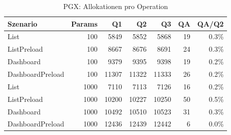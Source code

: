 \begin{table}[ht]
\caption{PGX: Allokationen pro Operation}
\begin{tabular}{lrrrrrr}
\toprule
Szenario & Params & Q1 & Q2 & Q3 & QA & QA/Q2 \\
\midrule
	List & 100 & 5849 & 5852 & 5868 & 19 & 0.3\% \\
	ListPreload & 100 & 8667 & 8676 & 8691 & 24 & 0.3\% \\
	Dashboard & 100 & 9379 & 9395 & 9398 & 19 & 0.2\% \\
	DashboardPreload & 100 & 11307 & 11322 & 11333 & 26 & 0.2\% \\
	List & 1000 & 7110 & 7113 & 7126 & 16 & 0.2\% \\
	ListPreload & 1000 & 10200 & 10227 & 10250 & 50 & 0.5\% \\
	Dashboard & 1000 & 10492 & 10510 & 10523 & 31 & 0.3\% \\
	DashboardPreload & 1000 & 12436 & 12439 & 12442 & 6 & 0.0\% \\
\bottomrule
\end{tabular}
\label{tab:benchmark_pgx_allocsperop}
\end{table}
	